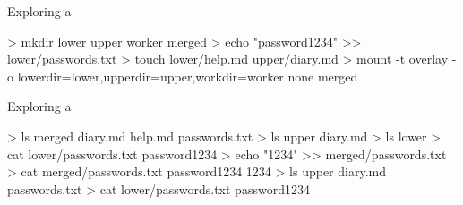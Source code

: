 \documentclass{slide}
\begin{document}

\begin{frame}[fragile]{Exploring a }
    \begin{code}[numbers=none]{}
> mkdir lower upper worker merged
> echo "password1234" >> lower/passwords.txt
> touch lower/help.md upper/diary.md
> mount -t overlay -o lowerdir=lower,upperdir=upper,workdir=worker none merged
    \end{code}
\end{frame}

\begin{frame}[fragile]{Exploring a }
    \vspace{-0.5em}
    \begin{code}[numbers=none]{}
> ls merged
diary.md  help.md  passwords.txt
> ls upper
diary.md
> ls lower
> cat lower/passwords.txt
password1234
> echo "1234" >> merged/passwords.txt
> cat merged/passwords.txt
password1234
1234
> ls upper
diary.md passwords.txt
> cat lower/passwords.txt
password1234
    \end{code}
\end{frame}
\end{document}
